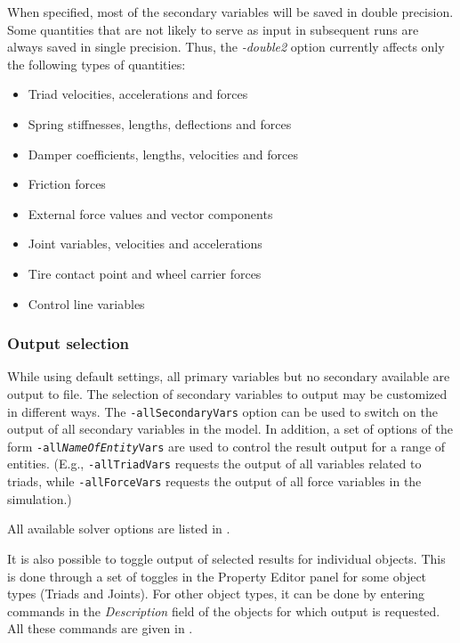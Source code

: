 {When specified,
most of the secondary variables will be saved in double precision.
Some quantities that are not likely to serve as input in subsequent runs
are always saved in single precision. Thus, the
{\sl-double2} option currently affects only the following types of quantities:

\begin{itemize}
\item Triad velocities, accelerations and forces
\item Spring stiffnesses, lengths, deflections and forces
\item Damper coefficients, lengths, velocities and forces
\item Friction forces
\item External force values and vector components
\item Joint variables, velocities and accelerations
\item Tire contact point and wheel carrier forces
\item Control line variables
\end{itemize}

\subsubsection{Output selection}

While using default settings, all primary variables but no secondary available
are output to file. The selection of secondary variables to output may be
customized in different ways. The {\tt-allSecondaryVars} option can be used to
switch on the output of all secondary variables in the model.
In addition, a set of options of the form {\tt-all{\sl NameOfEntity}Vars}
are used to control the result output for a range of entities.
(E.g., {\tt-allTriadVars} requests the output of all variables related to
triads, while {\tt-allForceVars} requests the output of all force variables
in the simulation.)

All available solver options are listed in
.

It is also possible to toggle output of selected results for individual objects.
This is done through a set of toggles in the Property Editor panel for some
object types (Triads and Joints). For other object types, it can be done by
entering commands in the {\sl Description} field of the objects for which
output is requested. All these commands are given
in .

}

